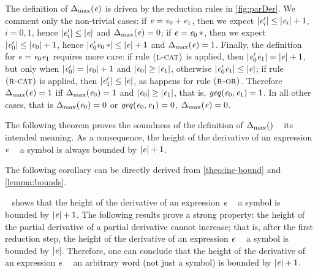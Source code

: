 The definition of ${\Delta_{\max}}({\mathit {e}})$ is driven by the reduction rules in \cref{fig:parDer}. We comment only the non-trivial cases: if $\mathit {e}=\mathit {e}_0\mathbin{+}\mathit {e}_1$, then we expect ${\mid}{\mathit {e}'_i}{\mid}\leq{\mid}{\ensuremath{\mathit {e}}_i}{\mid}+1$, $i=0,1$,
hence ${\mid}{\mathit {e}'_i}{\mid}\leq{\mid}{\ensuremath{\mathit {e}}}{\mid}$ and ${\Delta_{\max}}({\mathit {e}})=0$;
if $\mathit {e}={{\mathit {e}_0}\mathop{*}}$, then we expect ${\mid}{\mathit {e}'_0}{\mid}\leq{\mid}{\ensuremath{\mathit {e}}_0}{\mid}+1$,
hence ${\mid}{\mathit {e}'_0{{\mathit {e}_0}\mathop{*}}}{\mid}\leq{\mid}{\ensuremath{\mathit {e}}}{\mid}+1$ and ${\Delta_{\max}}({\mathit {e}})=1$. Finally, the definition for $\mathit {e}=\mathit {e}_0\mathit {e}_1$ requires more care:
if rule $\textsc{({l-cat})}$ is applied, then ${\mid}{\mathit {e}_0'\mathit {e}_1}{\mid}={\mid}{\mathit {e}}{\mid}+1$, but only when ${\mid}{\mathit {e}_0'}{\mid}={\mid}{\mathit {e}_0}{\mid}+1$ and ${\mid}{\mathit {e}_0}{\mid}\geq{\mid}{\ensuremath{\mathit {e}}_1}{\mid}$, otherwise ${\mid}{\mathit {e}_0'\mathit {e}_1}{\mid}\leq{\mid}{\ensuremath{\mathit {e}}}{\mid}$; if rule $\textsc{({r-cat})}$ is applied, then ${\mid}{\mathit {e}'_1}{\mid}\leq{\mid}{\ensuremath{\mathit {e}}}{\mid}$, as happens for rule $\textsc{({r-or})}$. Therefore ${\Delta_{\max}}({\mathit {e}})=1$ iff ${\Delta_{\max}}({\mathit {e}_0})=1$ and ${\mid}{\mathit {e}_0}{\mid}\geq{\mid}{\ensuremath{\mathit {e}}_1}{\mid}$, that is, $\mathit{geq}({\mathit {e}_0},{\mathit {e}_1})=1$. In all other cases, that is ${\Delta_{\max}}({\mathit {e}_0})=0$ or $\mathit{geq}({\mathit {e}_0},{\mathit {e}_1})=0$, ${\Delta_{\max}}({\mathit {e}})=0$.

The following theorem proves the soundness of the definition of ${\Delta_{\max}}({})$ \wrt~ its intended meaning. As a consequence, the height of the derivative of an expression $\mathit {e}$ \wrt~ a symbol is always bounded by ${\mid}{\mathit {e}}{\mid}+1$.

The following corollary can be directly derived from \cref{theo:inc-bound} and \cref{lemma:bounds}.
~ shows that the height of the derivative of an expression $\mathit {e}$ \wrt~ a symbol is bounded by ${\mid}{\mathit {e}}{\mid}+1$.
The following results prove a strong property: the height of the partial derivative of a partial derivative cannot increase; that is, after the first reduction step, the height of the derivative of an expression $\mathit {e}$ \wrt~ a symbol is bounded by ${\mid}{\mathit {e}}{\mid}$.
Therefore, one can conclude that the height of the derivative of an expression $\mathit {e}$ \wrt~ an arbitrary  word (not just a symbol) is bounded by ${\mid}{\mathit {e}}{\mid}+1$.

